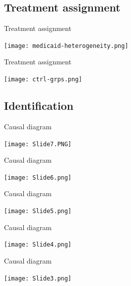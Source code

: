\documentclass[hyperref={pdfpagelabels=false}]{beamer}
\begin{document}
\subsection{Treatment assignment}

\begin{frame}{Treatment assignment}
    \begin{center}
	\texttt{[image: medicaid-heterogeneity.png]}
    \end{center}
\end{frame}

\begin{frame}{Treatment assignment}
    \begin{center}
	\texttt{[image: ctrl-grps.png]}  
    \end{center}
\end{frame}

\subsection{Identification}

\begin{frame}{Causal diagram}
    \begin{center}
	\texttt{[image: Slide7.PNG]}
    \end{center}
\end{frame}

\begin{frame}{Causal diagram}
    \begin{center}
	\texttt{[image: Slide6.png]}
    \end{center}
\end{frame}

\begin{frame}{Causal diagram}
    \begin{center}
	\texttt{[image: Slide5.png]}
    \end{center}
\end{frame}

\begin{frame}{Causal diagram}
    \begin{center}
	\texttt{[image: Slide4.png]}
    \end{center}
\end{frame}

\begin{frame}{Causal diagram}
    \begin{center}
	\texttt{[image: Slide3.png]}
    \end{center}
\end{frame}
\end{document}

